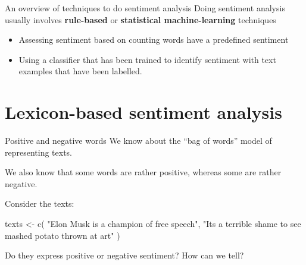 \documentclass[
  10pt,
  ignorenonframetext,
  aspectratio=169]{beamer}
\newenvironment{Shaded}{\begin{snugshade}}{\end{snugshade}}
\newcommand{\FunctionTok}[1]{\textcolor[rgb]{0.94,0.94,0.56}{#1}}
\newcommand{\NormalTok}[1]{\textcolor[rgb]{0.80,0.80,0.80}{#1}}
\newcommand{\OtherTok}[1]{\textcolor[rgb]{0.94,0.94,0.56}{#1}}
\newcommand{\StringTok}[1]{\textcolor[rgb]{0.80,0.58,0.58}{#1}}
\begin{document}
\begin{frame}{An overview of techniques to do sentiment analysis}
\protect\hypertarget{an-overview-of-techniques-to-do-sentiment-analysis}{}
Doing sentiment analysis usually involves \textbf{rule-based} or
\textbf{statistical machine-learning} techniques

\begin{itemize}
  \item<2->Assessing sentiment based on counting words have a predefined sentiment
  \item<3->Using a classifier that has been trained to identify sentiment with text examples that have been labelled.
\end{itemize}
\end{frame}

\hypertarget{lexicon-based-sentiment-analysis}{%
\section{Lexicon-based sentiment
analysis}\label{lexicon-based-sentiment-analysis}}

\begin{frame}[fragile]{Positive and negative words}
\protect\hypertarget{positive-and-negative-words}{}
We know about the ``bag of words'' model of representing texts.

We also know that some words are rather positive, whereas some are
rather negative.

Consider the texts:

\medskip

\begin{Shaded}
\begin{Highlighting}[]
\NormalTok{texts }\OtherTok{\textless{}{-}} \FunctionTok{c}\NormalTok{(}
  \StringTok{"Elon Musk is a champion of free speech"}\NormalTok{,}
  \StringTok{"It\textquotesingle{}s a terrible shame to see mashed potato thrown at art"}
\NormalTok{)}
\end{Highlighting}
\end{Shaded}

\medskip

Do they express positive or negative sentiment? How can we tell?
\end{frame}
\end{document}
